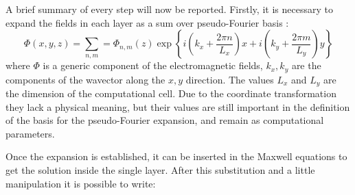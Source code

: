 \documentclass[a4paper,10pt]{report}
\begin{document}
A brief summary of every step will now be reported. Firstly, it is necessary to expand the fields in each layer as a sum over pseudo-Fourier basis :
\begin{equation} \label{eq:Fourier_ex}
\Phi(x,y,z)= \sum_{n,m}=\Phi_{n,m}(z)\exp \left\{ i(k_x+\frac{2\pi n}{L_x})x+i(k_y+\frac{2\pi m}{L_y})y \right\}
\end{equation}
where $\Phi$ is a generic component of the electromagnetic fields, $k_x,k_y$ are the components of the wavector along the $x,y$ direction. The values $L_x$ and $L_y$ are the dimension of the computational cell. Due to the coordinate transformation they lack a physical meaning, but their values are still important in the definition of the basis for the pseudo-Fourier expansion, and remain as computational parameters.

Once the expansion is established, it can be inserted in the Maxwell equations to get the solution inside the single layer. After this substitution and a little manipulation it is possible to write:
\end{document}
